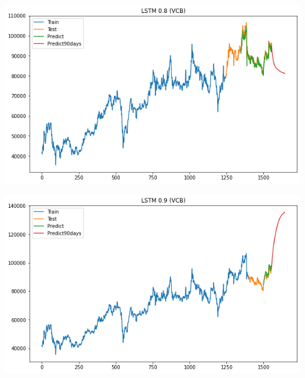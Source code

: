 \documentclass[conference]{IEEEtran}
\begin{document}
\begin{minipage}{0.23\textwidth}
    \centering
    \includegraphics[width=\linewidth]{images/LSTM/LSTM_VCB_90days_82.png}
    \label{fig:image1}
\end{minipage}
\hfill
\begin{minipage}{0.23\textwidth}
    \centering
    \includegraphics[width=\linewidth]{images/LSTM/LSTM_VCB_90days_91.png}
    \label{fig:image2}
\end{minipage}
\end{document}
